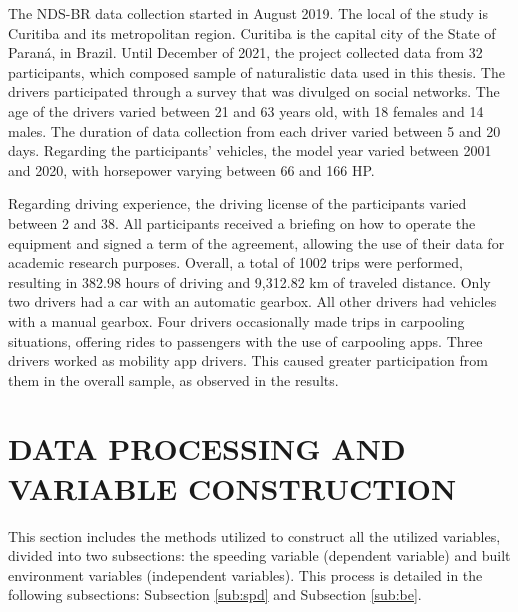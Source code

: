 The NDS-BR data collection started in August 2019. The local of the study is Curitiba and its metropolitan region. Curitiba is the capital city of the State of Paraná, in Brazil. Until December of 2021, the project collected data from 32 participants, which composed sample of naturalistic data used in this thesis. The drivers participated through a survey that was divulged on social networks. The age of the drivers varied between 21 and 63 years old, with 18 females and 14 males. The duration of data collection from each driver varied between 5 and 20 days. Regarding the participants' vehicles, the model year varied between 2001 and 2020, with horsepower varying between 66 and 166 HP. 

Regarding driving experience, the driving license of the participants varied between 2 and 38. All participants received a briefing on how to operate the equipment and signed a term of the agreement, allowing the use of their data for academic research purposes. Overall, a total of 1002 trips were performed, resulting in 382.98 hours of driving and 9,312.82 km of traveled distance. Only two drivers had a car with an automatic gearbox. All other drivers had vehicles with a manual gearbox. Four drivers occasionally made trips in carpooling situations, offering rides to passengers with the use of carpooling apps. Three drivers worked as mobility app drivers. This caused greater participation from them in the overall sample, as observed in the results. 


\section{DATA PROCESSING AND VARIABLE CONSTRUCTION} \label{data}


This section includes the methods utilized to construct all the utilized variables, divided into two subsections: the speeding variable (dependent variable) and built environment variables (independent variables). This process is detailed in the following subsections: Subsection \ref{sub:spd} and Subsection \ref{sub:be}.

